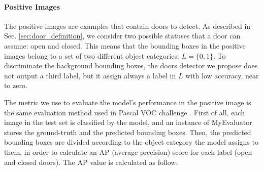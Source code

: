 \paragraph{Positive Images} The positive images are examples that contain doors to detect. As described in Sec. \ref{sec:door_definition}, we consider two possible statuses that a door can assume: open and closed. This means that the bounding boxes in the positive images belong to a set of two different object categories: $L = \{0, 1\}$. To discriminate the background bounding boxes, the doors detector we propose does not output a third label, but it assign always a label in $L$ with  low accuracy, near to zero. 

The metric we use to evaluate the model's performance in the positive image is the same evaluation method used in Pascal VOC challenge \cite{pascal}. First of all, each image in the test set is classified by the model, and an instance of \textsf{MyEvaluator} stores the  ground-truth and the predicted bounding boxes. Then, the predicted bounding boxes are divided according to the object category the model assigns to them, in order to calculate an AP (average precision) score for each label (open and closed doors). The AP value is calculated as follow:

